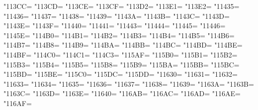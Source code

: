 \XeTeXcharclass"113CC=\KclassCM
\XeTeXcharclass"113CD=\KclassCM
\XeTeXcharclass"113CE=\KclassCM
\XeTeXcharclass"113CF=\KclassCM
\XeTeXcharclass"113D2=\KclassCM
\XeTeXcharclass"113E1=\KclassCM
\XeTeXcharclass"113E2=\KclassCM
\XeTeXcharclass"11435=\KclassCM
\XeTeXcharclass"11436=\KclassCM
\XeTeXcharclass"11437=\KclassCM
\XeTeXcharclass"11438=\KclassCM
\XeTeXcharclass"11439=\KclassCM
\XeTeXcharclass"1143A=\KclassCM
\XeTeXcharclass"1143B=\KclassCM
\XeTeXcharclass"1143C=\KclassCM
\XeTeXcharclass"1143D=\KclassCM
\XeTeXcharclass"1143E=\KclassCM
\XeTeXcharclass"1143F=\KclassCM
\XeTeXcharclass"11440=\KclassCM
\XeTeXcharclass"11441=\KclassCM
\XeTeXcharclass"11443=\KclassCM
\XeTeXcharclass"11444=\KclassCM
\XeTeXcharclass"11445=\KclassCM
\XeTeXcharclass"11446=\KclassCM
\XeTeXcharclass"1145E=\KclassCM
\XeTeXcharclass"114B0=\KclassCM
\XeTeXcharclass"114B1=\KclassCM
\XeTeXcharclass"114B2=\KclassCM
\XeTeXcharclass"114B3=\KclassCM
\XeTeXcharclass"114B4=\KclassCM
\XeTeXcharclass"114B5=\KclassCM
\XeTeXcharclass"114B6=\KclassCM
\XeTeXcharclass"114B7=\KclassCM
\XeTeXcharclass"114B8=\KclassCM
\XeTeXcharclass"114B9=\KclassCM
\XeTeXcharclass"114BA=\KclassCM
\XeTeXcharclass"114BB=\KclassCM
\XeTeXcharclass"114BC=\KclassCM
\XeTeXcharclass"114BD=\KclassCM
\XeTeXcharclass"114BE=\KclassCM
\XeTeXcharclass"114BF=\KclassCM
\XeTeXcharclass"114C0=\KclassCM
\XeTeXcharclass"114C1=\KclassCM
\XeTeXcharclass"114C3=\KclassCM
\XeTeXcharclass"115AF=\KclassCM
\XeTeXcharclass"115B0=\KclassCM
\XeTeXcharclass"115B1=\KclassCM
\XeTeXcharclass"115B2=\KclassCM
\XeTeXcharclass"115B3=\KclassCM
\XeTeXcharclass"115B4=\KclassCM
\XeTeXcharclass"115B5=\KclassCM
\XeTeXcharclass"115B8=\KclassCM
\XeTeXcharclass"115B9=\KclassCM
\XeTeXcharclass"115BA=\KclassCM
\XeTeXcharclass"115BB=\KclassCM
\XeTeXcharclass"115BC=\KclassCM
\XeTeXcharclass"115BD=\KclassCM
\XeTeXcharclass"115BE=\KclassCM
\XeTeXcharclass"115C0=\KclassCM
\XeTeXcharclass"115DC=\KclassCM
\XeTeXcharclass"115DD=\KclassCM
\XeTeXcharclass"11630=\KclassCM
\XeTeXcharclass"11631=\KclassCM
\XeTeXcharclass"11632=\KclassCM
\XeTeXcharclass"11633=\KclassCM
\XeTeXcharclass"11634=\KclassCM
\XeTeXcharclass"11635=\KclassCM
\XeTeXcharclass"11636=\KclassCM
\XeTeXcharclass"11637=\KclassCM
\XeTeXcharclass"11638=\KclassCM
\XeTeXcharclass"11639=\KclassCM
\XeTeXcharclass"1163A=\KclassCM
\XeTeXcharclass"1163B=\KclassCM
\XeTeXcharclass"1163C=\KclassCM
\XeTeXcharclass"1163D=\KclassCM
\XeTeXcharclass"1163E=\KclassCM
\XeTeXcharclass"11640=\KclassCM
\XeTeXcharclass"116AB=\KclassCM
\XeTeXcharclass"116AC=\KclassCM
\XeTeXcharclass"116AD=\KclassCM
\XeTeXcharclass"116AE=\KclassCM
\XeTeXcharclass"116AF=\KclassCM
